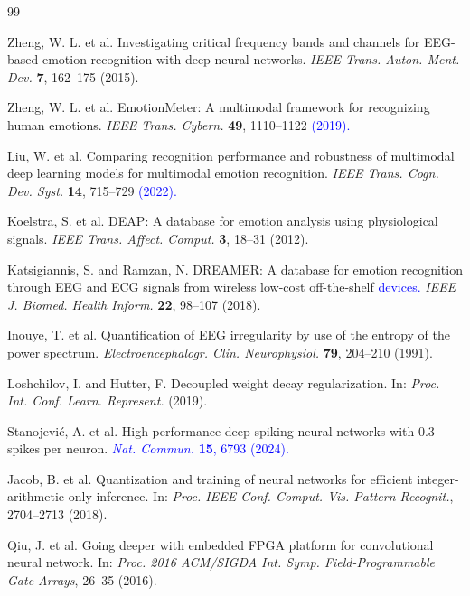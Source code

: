 \documentclass[12pt]{article}
\newcommand{\rev}[1]{\textcolor{blue}{#1}}
\begin{document}
 \begin{thebibliography}{99}

Zheng, W. L. et al.
Investigating critical frequency bands and channels for EEG-based emotion recognition with deep neural networks.
\textit{IEEE Trans. Auton. Ment. Dev.} \textbf{7}, 162--175 (2015).

Zheng, W. L. et al.
EmotionMeter: A multimodal framework for recognizing human emotions.
\textit{IEEE Trans. Cybern.} \textbf{49}, 1110--1122 \rev{(2019).}

Liu, W. et al.
Comparing recognition performance and robustness of multimodal deep learning models for multimodal emotion recognition.
\textit{IEEE Trans. Cogn. Dev. Syst.} \textbf{14}, 715--729 \rev{(2022).}

Koelstra, S. et al.
DEAP: A database for emotion analysis using physiological signals.
\textit{IEEE Trans. Affect. Comput.} \textbf{3}, 18--31 (2012).

Katsigiannis, S. and Ramzan, N.
DREAMER: A database for emotion recognition through EEG and ECG signals from wireless low-cost off-the-shelf \rev{devices.}
\textit{IEEE J. Biomed. Health Inform.} \textbf{22}, 98--107 (2018).

Inouye, T. et al.
Quantification of EEG irregularity by use of the entropy of the power spectrum.
\textit{Electroencephalogr. Clin. Neurophysiol.} \textbf{79}, 204--210 (1991).

Loshchilov, I. and Hutter, F.
Decoupled weight decay regularization.
In: \textit{Proc. Int. Conf. Learn. Represent.} (2019).

Stanojevi\'{c}, A. et al.
High-performance deep spiking neural networks with 0.3 spikes per neuron.
\rev{\textit{Nat. Commun.} \textbf{15}, 6793 (2024).}

Jacob, B. et al.
Quantization and training of neural networks for efficient integer-arithmetic-only inference.
In: \textit{Proc. IEEE Conf. Comput. Vis. Pattern Recognit.}, 2704--2713 (2018).

Qiu, J. et al.
Going deeper with embedded FPGA platform for convolutional neural network.
In: \textit{Proc. 2016 ACM/SIGDA Int. Symp. Field-Programmable Gate Arrays}, 26--35 (2016).

\end{thebibliography}
\end{document}
